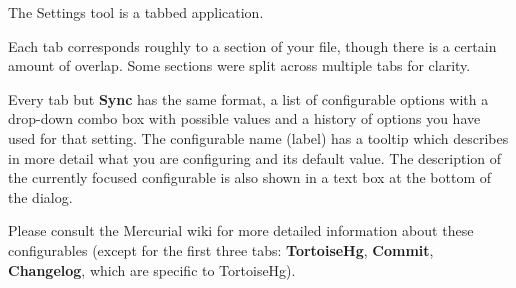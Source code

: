 \documentclass[letterpaper,10pt,english]{manual}
\begin{document}
The Settings tool is a tabbed application.

Each tab corresponds roughly to a section of your 
file, though there is a certain amount of overlap. Some sections were
split across multiple tabs for clarity.

Every tab but \textbf{Sync} has the same format, a list of
configurable options with a drop-down combo box with possible values and
a history of options you have used for that setting. The configurable
name (label) has a tooltip which describes in more detail what you are
configuring and its default value.  The description of the currently
focused configurable is also shown in a text box at the bottom of the
dialog.

Please consult the Mercurial wiki for more detailed information about
these configurables (except for the first three tabs:
\textbf{TortoiseHg}, \textbf{Commit}, \textbf{Changelog}, which
are specific to TortoiseHg).
\hypertarget{module-TortoiseHg.settings}{}
\end{document}
